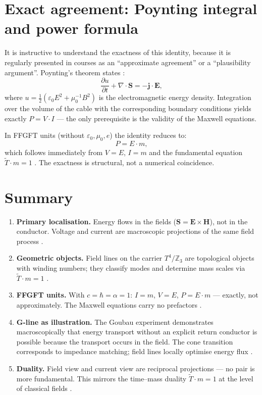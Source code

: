 \section{Exact agreement: Poynting integral and power formula}

It is instructive to understand the exactness of this identity, because it
is regularly presented in courses as an ``approximate agreement'' or a
``plausibility argument''. Poynting's theorem states \EM:
\[
  \frac{\partial u}{\partial t} + \nabla \cdot \mathbf{S} = -\mathbf{j}\cdot\mathbf{E},
\]
where $u = \frac{1}{2}(\varepsilon_0 E^2 + \mu_0^{-1}B^2)$ is the
electromagnetic energy density. Integration over the volume of the cable
with the corresponding boundary conditions yields exactly $P = V \cdot I$
--- the only prerequisite is the validity of the Maxwell equations.

In FFGFT units (without $\varepsilon_0, \mu_0, e$) the identity reduces to:
\[
  P = E \cdot m,
\]
which follows immediately from $V = E$, $I = m$ and the fundamental
equation $\tilde{T}\cdot m=1$ \KM. The exactness is structural, not a
numerical coincidence.

\section{Summary}

\begin{enumerate}[nosep]
\item \textbf{Primary localisation.} Energy flows in the fields
  ($\mathbf{S} = \mathbf{E}\times\mathbf{H}$), not in the conductor.
  Voltage and current are macroscopic projections of the same field
  process \EM.

\item \textbf{Geometric objects.} Field lines on the carrier
  $T^4/\mathbb{Z}_3$ are topological objects with winding numbers; they
  classify modes and determine mass scales via $\tilde{T}\cdot m=1$ \BM.

\item \textbf{FFGFT units.} With $c=\hbar=\alpha=1$: $I=m$, $V=E$,
  $P=E\cdot m$ --- exactly, not approximately. The Maxwell equations
  carry no prefactors \KM.

\item \textbf{G-line as illustration.} The Goubau experiment demonstrates
  macroscopically that energy transport without an explicit return conductor
  is possible because the transport occurs in the field. The cone transition
  corresponds to impedance matching; field lines locally optimise energy
  flux \EM.

\item \textbf{Duality.} Field view and current view are reciprocal
  projections --- no pair is more fundamental. This mirrors the time--mass
  duality $\tilde{T}\cdot m=1$ at the level of classical fields \SM.
\end{enumerate}

